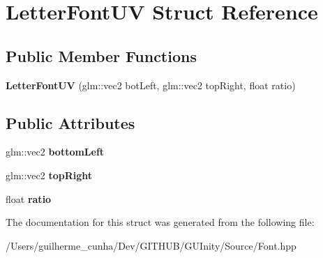 \hypertarget{struct_letter_font_u_v}{}\section{Letter\+Font\+U\+V Struct Reference}
\label{struct_letter_font_u_v}
\subsection*{Public Member Functions}
\begin{DoxyCompactItemize}
\item 
\hypertarget{struct_letter_font_u_v_a924ff6131811751cc24d675c6c54a13b}{}{\bfseries Letter\+Font\+U\+V} (glm\+::vec2 bot\+Left, glm\+::vec2 top\+Right, float ratio)\label{struct_letter_font_u_v_a924ff6131811751cc24d675c6c54a13b}

\end{DoxyCompactItemize}
\subsection*{Public Attributes}
\begin{DoxyCompactItemize}
\item 
\hypertarget{struct_letter_font_u_v_aa4da6169fb2f600c42779a5edd347210}{}glm\+::vec2 {\bfseries bottom\+Left}\label{struct_letter_font_u_v_aa4da6169fb2f600c42779a5edd347210}

\item 
\hypertarget{struct_letter_font_u_v_a3f19ecd268cec717c3aa4590ff530434}{}glm\+::vec2 {\bfseries top\+Right}\label{struct_letter_font_u_v_a3f19ecd268cec717c3aa4590ff530434}

\item 
\hypertarget{struct_letter_font_u_v_afeebe5aa67d57fe1950e3f6b3decb357}{}float {\bfseries ratio}\label{struct_letter_font_u_v_afeebe5aa67d57fe1950e3f6b3decb357}

\end{DoxyCompactItemize}


The documentation for this struct was generated from the following file\+:\begin{DoxyCompactItemize}
\item 
/\+Users/guilherme\+\_\+cunha/\+Dev/\+G\+I\+T\+H\+U\+B/\+G\+U\+Inity/\+Source/Font.\+hpp\end{DoxyCompactItemize}
